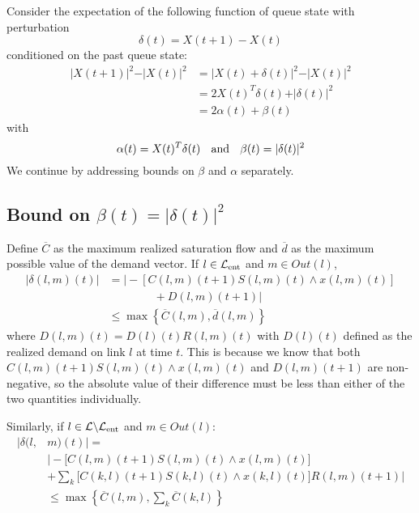 \label{distributedproof}


Consider the expectation of the following function of queue state with perturbation 
\begin{equation} \label{delta_def}
\delta(t) = X(t+1) - X(t)
\end{equation}  
conditioned on the past queue state:
\begin{align}
\vert X(t+1) \vert^2  - \vert X(t)\vert^2 &= \vert X(t) + \delta (t) \vert^2 - \vert X(t)\vert^2 \\
\nonumber &= 2X(t)^{T}\delta(t) + \vert \delta(t)  \vert^2 \\
\nonumber &= 2\alpha(t) + \beta(t) 
\end{align}
with 
\begin{equation} \label{alpha_beta_defs}
\alpha(t)  = X(t)^{T}\delta(t)  \text{   \; and \;  }\beta(t) = \vert \delta (t) \vert^{2}
\end{equation}
We continue by addressing bounds on $\beta$ and $\alpha$ separately. 

\subsection*{Bound on $\beta(t) = \vert \delta (t)\vert^{2}$}
Define $\overline{C}$ as the maximum realized saturation flow and $\overline{d}$ as the maximum possible value of the demand vector. 
If $l \in \mathcal{L}_{\text{ent}}$ and $m \in Out(l)$,
\begin{align} \nonumber
\big| \delta(l,m)(t)  \big| &= \bigg| -[C(l,m)(t+1)S(l,m)(t) \wedge x(l,m)(t)]  \\ \nonumber
&\qquad \qquad + D(l,m)(t+1) \bigg| \\
& \leq \max\left\{  \overline{C}(l,m) , \overline d (l,m) \right\} \label{deltabound1}
\end{align}
where $D(l,m)(t)  = D(l) (t) R(l,m)(t)$ with $D(l)(t)$ defined as the realized demand on link $l$ at time $t$. 
This is because we know that both $C(l,m)(t+1)S(l,m)(t) \wedge x(l,m)(t)$ and $D(l,m)(t+1)$ are non-negative, so the absolute value of their difference must be less than either of the two quantities individually. 

Similarly, if $l \in \mathcal{L}\backslash\mathcal{L}_{\text{ent}}$ and $m \in Out(l)$:
\begin{align} \nonumber  
\big | \delta(l,&m) (t)  \big |  = \\ \label{deltabound}
 & \bigg\vert-\big[C(l,m)(t+1)S(l,m)(t) \wedge x(l,m)(t)\big]  \\  \nonumber
 & + \sum_{k}\big[C(k,l)(t+1)S(k,l)(t) \wedge x(k,l)(t)\big] R(l,m)(t+1)\bigg\vert  \\
& \leq \max\left\{  \overline{C}(l,m) , \sum_{k} \overline{C}(k,l) \right\} \label{deltabound2}
\end{align}

